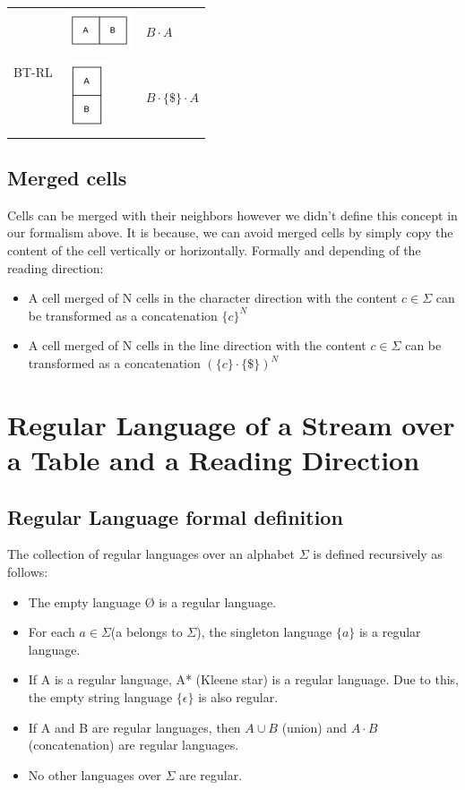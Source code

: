\documentclass{article}
\begin{document}
\begin{longtable}{|m{}|m{}|m{}|}
\hline
    \multirow{2}{*}{BT-RL} & \includegraphics{table-h} & $B \cdot A$ \\
\cline{2-3}
                           & \includegraphics{table-v} & $B \cdot \{\$\} \cdot A$ \\
\hline
\end{longtable}

\subsection{Merged cells}
Cells can be merged with their neighbors however we didn't define this concept in our formalism above. It is because, we
can avoid merged cells by simply copy the content of the cell vertically or horizontally. Formally and depending of the
reading direction:
\begin{itemize}
    \item A cell merged of N cells in the character direction with the content $c \in \Sigma$ can be transformed as a
    concatenation $\{c\}^N$
    \item A cell merged of N cells in the line direction with the content $c \in \Sigma$ can be transformed as a
    concatenation $(\{c\} \cdot \{\$\})^N$
\end{itemize}

\section{Regular Language of a Stream over a Table and a Reading Direction}

\subsection{Regular Language formal definition}
The collection of regular languages over an alphabet $\Sigma$ is defined recursively as follows:
\begin{itemize}
    \item The empty language Ø is a regular language.
    \item For each $a \in \Sigma$(a belongs to $\Sigma$), the singleton language $\{a\}$ is a regular language.
    \item If A is a regular language, A* (Kleene star) is a regular language. Due to this, the empty string language
    $\{\epsilon\}$ is also regular.
    \item If A and B are regular languages, then $A \cup B$ (union) and $A \cdot B$ (concatenation) are regular languages.
    \item No other languages over $\Sigma$ are regular.
\end{itemize}
\end{document}

